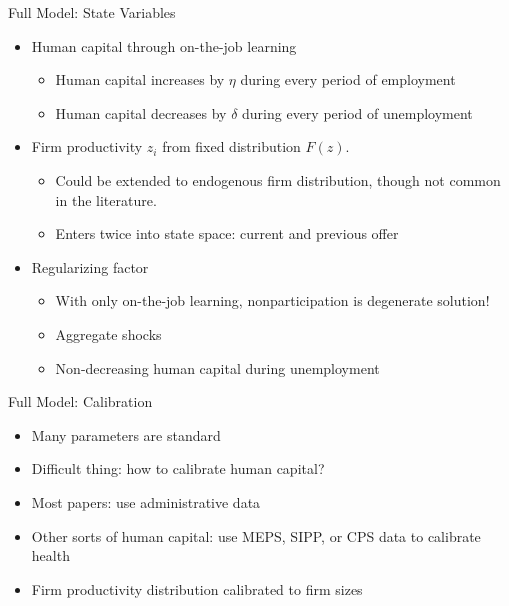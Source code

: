 \documentclass[lualatex]{beamer}
\begin{document}
\begin{frame}{Full Model: State Variables}

	\begin{itemize}

	\item Human capital through on-the-job learning

	\begin{itemize}

		\item Human capital increases by $\eta$ during every period of employment

		\item Human capital decreases by $\delta$ during every period of unemployment

	\end{itemize}

	\item Firm productivity $z_i$ from fixed distribution $F(z)$.

	\begin{itemize}
		\item Could be extended to endogenous firm distribution, though not common in the literature.

		\item Enters twice into state space: current and previous offer

	\end{itemize}

	\item Regularizing factor

	\begin{itemize}

		\item With only on-the-job learning, nonparticipation is degenerate solution!

		\item Aggregate shocks

		\item Non-decreasing human capital during unemployment

	\end{itemize}

\end{itemize}

\end{frame}

\begin{frame}{Full Model: Calibration}
\begin{itemize}
	\item Many parameters are standard

	\item Difficult thing: how to calibrate human capital?

	\item Most papers: use administrative data

	\item Other sorts of human capital: use MEPS, SIPP, or CPS data to calibrate health

	\item Firm productivity distribution calibrated to firm sizes

\end{itemize}
\end{frame}
\end{document}
